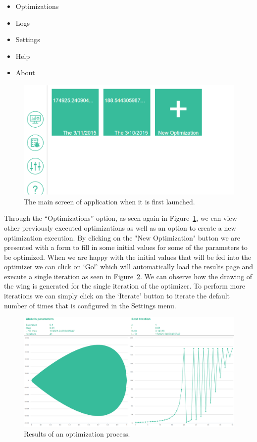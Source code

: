 \documentclass{article}
\begin{document}
\begin{itemize}
  \item Optimizations
  \item Logs
  \item Settings
  \item Help
  \item About
\end{itemize}

\begin{figure}[h!]
  \centering
    \includegraphics[scale=0.35]{images/optimizations.png}
  \caption{The main screen of application when it is first launched.}
  \label{fig:AppMain}
\end{figure}

Through the ``Optimizations'' option, as seen again in Figure~\ref{fig:AppMain}, we can view other previously executed optimizations as well as an option to create a new optimization execution. By clicking on the "New Optimization" button we are presented with a form to fill in some initial values for some of the parameters to be optimized. When we are happy with the initial values that will be fed into the optimizer we can click on `Go!' which will automatically load the results page and execute a single iteration as seen in Figure~\ref{fig:OptimizationResults}. We can observe how the drawing of the wing is generated for the single iteration of the optimizer. To perform more iterations we can simply click on the `Iterate' button to iterate the default number of times that is configured in the Settings menu.

\begin{figure}[h!]
  \centering
    \includegraphics[scale=0.20]{images/optimizations_res.png}
  \caption{Results of an optimization process.}
  \label{fig:OptimizationResults}
\end{figure}
\end{document}
